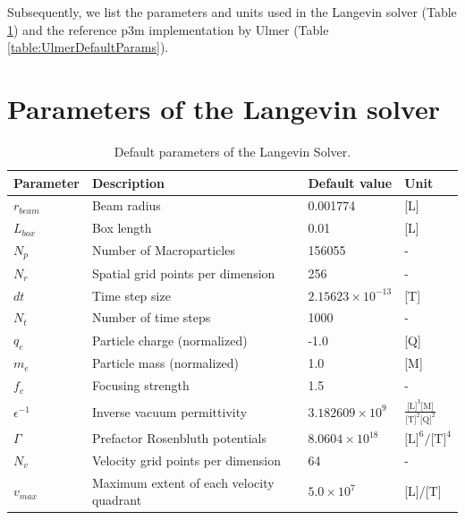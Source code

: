 Subsequently, we list the parameters and units used in the Langevin solver (Table
\ref{table:langevinDefaultParams}) and the reference \gls{p3m} implementation by Ulmer \cite{p3m_ulmer} (Table
\ref{table:UlmerDefaultParams}).

\pagebreak

\section{Parameters of the Langevin solver}
\label{appendix:ourParams}

\begin{table}[h]
    \caption{Default parameters of the Langevin Solver.}
    \label{table:langevinDefaultParams}
    \begin{center}
        \begin{tabular}[c]{llll}
            \toprule
            \multicolumn{1}{l}{\textbf{Parameter}} & 
            \multicolumn{1}{l}{\textbf{Description}} & 
            \multicolumn{1}{l}{\textbf{Default value}} &
            \multicolumn{1}{l}{\textbf{Unit}} \\
            \hline
            $r_{beam}$ & Beam radius & 0.001774  & [L] \\
            $L_{box}$ & Box length & 0.01 & [L] \\
            $N_p$ & Number of Macroparticles & 156055 & - \\
            $N_r$ & Spatial grid points per dimension & 256 & - \\
            $dt$ & Time step size & $2.15623\times10^{-13}$ & [T] \\
            $N_t$ & Number of time steps & 1000 & - \\
            $q_e$ & Particle charge (normalized) & -1.0 & [Q] \\
            $m_e$ & Particle mass (normalized) & 1.0 & [M] \\
            $f_c$ & Focusing strength & 1.5 & - \\
            $\epsilon^{-1}$ & Inverse vacuum permittivity & $3.182609\times10^9$ & $\frac{\text{[L]}^3
            \text{[M]}}{\text{[T]}^2 \text{[Q]}^2}$ \\
                $\Gamma$ & Prefactor Rosenbluth potentials & $8.0604\times10^{18}$ &
                $\text{[L]}^6/\text{[T]}^4$  \\
            $N_v$ & Velocity grid points per dimension & 64 & - \\
            $v_{max}$ & Maximum extent of each velocity quadrant & $5.0\times10^7$ & [L]/[T] \\

            \hline
        \end{tabular}
    \end{center}
\end{table}

